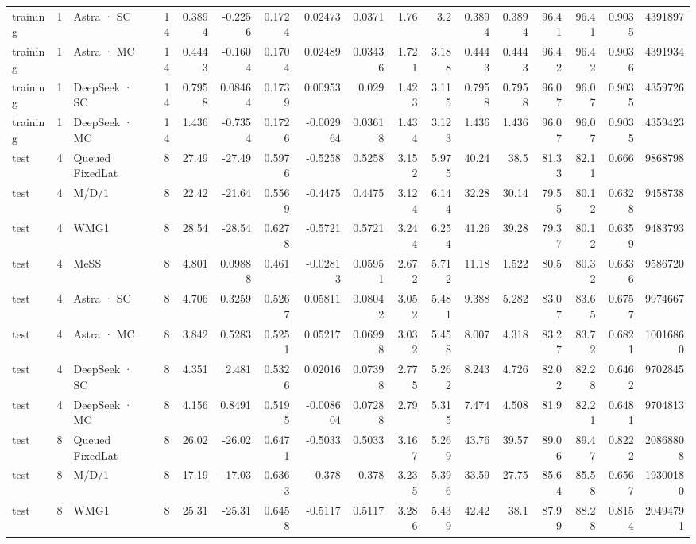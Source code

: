 \begin{tabular}{lrlrrrrrrrrrrrrrr}
training & 1 & Astra · SC & 14 & 0.3894 & -0.2256 & 0.1724 & 0.02473 & 0.0371 & 1.76 & 3.2 & 0.3894 & 0.3894 & 96.41 & 96.41 & 0.9035 & 4391897 \\
training & 1 & Astra · MC & 14 & 0.4443 & -0.1604 & 0.1704 & 0.02489 & 0.03436 & 1.721 & 3.188 & 0.4443 & 0.4443 & 96.42 & 96.42 & 0.9036 & 4391934 \\
training & 1 & DeepSeek · SC & 14 & 0.7958 & 0.08464 & 0.1739 & 0.00953 & 0.029 & 1.423 & 3.115 & 0.7958 & 0.7958 & 96.07 & 96.07 & 0.9035 & 4359726 \\
training & 1 & DeepSeek · MC & 14 & 1.436 & -0.7354 & 0.1726 & -0.002964 & 0.03618 & 1.434 & 3.123 & 1.436 & 1.436 & 96.07 & 96.07 & 0.9035 & 4359423 \\
test & 4 & Queued FixedLat & 8 & 27.49 & -27.49 & 0.5976 & -0.5258 & 0.5258 & 3.152 & 5.975 & 40.24 & 38.5 & 81.33 & 82.11 & 0.666 & 9868798 \\
test & 4 & M/D/1 & 8 & 22.42 & -21.64 & 0.5569 & -0.4475 & 0.4475 & 3.124 & 6.144 & 32.28 & 30.14 & 79.55 & 80.12 & 0.6328 & 9458738 \\
test & 4 & WMG1 & 8 & 28.54 & -28.54 & 0.6278 & -0.5721 & 0.5721 & 3.244 & 6.254 & 41.26 & 39.28 & 79.37 & 80.12 & 0.6359 & 9483793 \\
test & 4 & MeSS & 8 & 4.801 & 0.09888 & 0.461 & -0.02813 & 0.05951 & 2.672 & 5.712 & 11.18 & 1.522 & 80.5 & 80.32 & 0.6336 & 9586720 \\
test & 4 & Astra · SC & 8 & 4.706 & 0.3259 & 0.5267 & 0.05811 & 0.08042 & 3.052 & 5.481 & 9.388 & 5.282 & 83.07 & 83.65 & 0.6757 & 9974667 \\
test & 4 & Astra · MC & 8 & 3.842 & 0.5283 & 0.5251 & 0.05217 & 0.06998 & 3.032 & 5.458 & 8.007 & 4.318 & 83.27 & 83.72 & 0.6821 & 10016860 \\
test & 4 & DeepSeek · SC & 8 & 4.351 & 2.481 & 0.5326 & 0.02016 & 0.07398 & 2.775 & 5.262 & 8.243 & 4.726 & 82.02 & 82.28 & 0.6462 & 9702845 \\
test & 4 & DeepSeek · MC & 8 & 4.156 & 0.8491 & 0.5195 & -0.008604 & 0.07288 & 2.79 & 5.315 & 7.474 & 4.508 & 81.9 & 82.21 & 0.6481 & 9704813 \\
test & 8 & Queued FixedLat & 8 & 26.02 & -26.02 & 0.6471 & -0.5033 & 0.5033 & 3.167 & 5.269 & 43.76 & 39.57 & 89.06 & 89.47 & 0.8222 & 20868808 \\
test & 8 & M/D/1 & 8 & 17.19 & -17.03 & 0.6363 & -0.378 & 0.378 & 3.235 & 5.396 & 33.59 & 27.75 & 85.64 & 85.58 & 0.6567 & 19300180 \\
test & 8 & WMG1 & 8 & 25.31 & -25.31 & 0.6458 & -0.5117 & 0.5117 & 3.286 & 5.439 & 42.42 & 38.1 & 87.99 & 88.28 & 0.8154 & 20494791 \\

\end{tabular}
